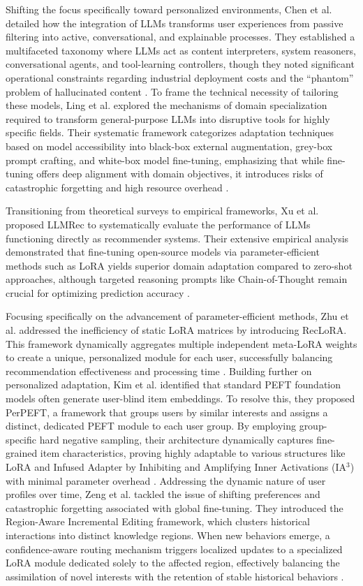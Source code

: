 \documentclass[journal,article,submit,pdftex,moreauthors]{Definitions/mdpi}
\begin{document}
Shifting the focus specifically toward personalized environments, Chen et al. detailed how the integration of LLMs transforms user experiences from passive filtering into active, conversational, and explainable processes. They established a multifaceted taxonomy where LLMs act as content interpreters, system reasoners, conversational agents, and tool-learning controllers, though they noted significant operational constraints regarding industrial deployment costs and the ``phantom'' problem of hallucinated content \citep{chen2024large}. To frame the technical necessity of tailoring these models, Ling et al. explored the mechanisms of domain specialization required to transform general-purpose LLMs into disruptive tools for highly specific fields. Their systematic framework categorizes adaptation techniques based on model accessibility into black-box external augmentation, grey-box prompt crafting, and white-box model fine-tuning, emphasizing that while fine-tuning offers deep alignment with domain objectives, it introduces risks of catastrophic forgetting and high resource overhead \citep{ling2025domain}.

Transitioning from theoretical surveys to empirical frameworks, Xu et al. proposed LLMRec to systematically evaluate the performance of LLMs functioning directly as recommender systems. Their extensive empirical analysis demonstrated that fine-tuning open-source models via parameter-efficient methods such as LoRA yields superior domain adaptation compared to zero-shot approaches, although targeted reasoning prompts like Chain-of-Thought remain crucial for optimizing prediction accuracy \citep{xu2025tapping}.

Focusing specifically on the advancement of parameter-efficient methods, Zhu et al. addressed the inefficiency of static LoRA matrices by introducing RecLoRA. This framework dynamically aggregates multiple independent meta-LoRA weights to create a unique, personalized module for each user, successfully balancing recommendation effectiveness and processing time \citep{zhu2024lifelong}. Building further on personalized adaptation, Kim et al. identified that standard PEFT foundation models often generate user-blind item embeddings. To resolve this, they proposed PerPEFT, a framework that groups users by similar interests and assigns a distinct, dedicated PEFT module to each user group. By employing group-specific hard negative sampling, their architecture dynamically captures fine-grained item characteristics, proving highly adaptable to various structures like LoRA and Infused Adapter by Inhibiting and Amplifying Inner Activations (IA$^3$) with minimal parameter overhead \citep{kim2026personalized}. Addressing the dynamic nature of user profiles over time, Zeng et al. tackled the issue of shifting preferences and catastrophic forgetting associated with global fine-tuning. They introduced the Region-Aware Incremental Editing framework, which clusters historical interactions into distinct knowledge regions. When new behaviors emerge, a confidence-aware routing mechanism triggers localized updates to a specialized LoRA module dedicated solely to the affected region, effectively balancing the assimilation of novel interests with the retention of stable historical behaviors \citep{zeng2026raie}.
\end{document}
